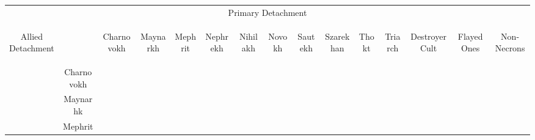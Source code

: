 \vspace*{2em}
\label{allies}
\begin{tabular}{||c c c c c c c c c c c c c c c||}
	\hline
	\multicolumn{15}{||c||}{Primary Detachment} \\
	\multirow{14}{*}{\begin{sideways}Allied Detachment\end{sideways}} & & \begin{sideways}Charnovokh \end{sideways} & \begin{sideways}Maynarkh \end{sideways} & \begin{sideways}Mephrit \end{sideways} & \begin{sideways}Nephrekh \end{sideways} & \begin{sideways}Nihilakh \end{sideways} & \begin{sideways}Novokh \end{sideways} & \begin{sideways}Sautekh \end{sideways} & \begin{sideways}Szarekhan \end{sideways} & \begin{sideways}Thokt \end{sideways} & \begin{sideways}Triarch \end{sideways} & \begin{sideways}Destroyer Cult \end{sideways} & \begin{sideways}Flayed Ones \end{sideways} & \begin{sideways}Non-Necrons \end{sideways}\\
	& Charnovokh & & \greyskull & \blackskull & \blackskull & \blackskull & \blackskull & \blackskull & \redskull & \blackskull & \blackskull & \greyskull & \redskull & \redskull \\
	& Maynarhk & \greyskull & & \greyskull & \greyskull & \redskull & \blackskull & \greyskull & \blackskull & \greyskull & \blackskull & \blackskull & \blackskull & \redskull \\
	& Mephrit & \blackskull & \greyskull & & \greyskull & \greyskull  & \blackskull & \redskull & \yellowskull & \blackskull & \blackskull & \greyskull & \redskull & \redskull \\

\end{tabular}
